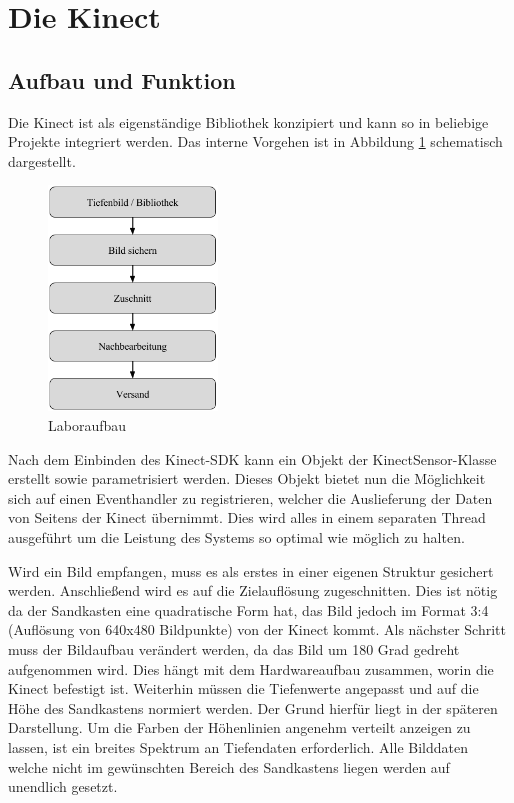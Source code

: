 \section{Die Kinect}
\begin{Spacing}{\mylinespace}

\subsection{Aufbau und Funktion}

Die Kinect ist als eigenständige Bibliothek konzipiert und kann so in beliebige Projekte integriert werden. Das interne Vorgehen ist in Abbildung \ref{fig:kinectdll} schematisch dargestellt. 

\begin{figure}[hbtp]
	\vspace{15px}
	\centering
	\includegraphics[width=0.4\textwidth]{graphics/block_dll.png}
	\caption{Laboraufbau}
	\label{fig:kinectdll}
\end{figure}

Nach dem Einbinden des Kinect-SDK kann ein Objekt der KinectSensor-Klasse erstellt sowie parametrisiert werden. Dieses Objekt bietet nun die Möglichkeit sich auf einen Eventhandler zu registrieren, welcher die Auslieferung der Daten von Seitens der Kinect übernimmt. Dies wird alles in einem separaten Thread ausgeführt um die Leistung des Systems so optimal wie möglich zu halten.

Wird ein Bild empfangen, muss es als erstes in einer eigenen Struktur gesichert werden. Anschließend wird es auf die Zielauflösung zugeschnitten.
Dies ist nötig da der Sandkasten eine quadratische Form hat, das Bild jedoch im Format 3:4 (Auflösung von 640x480 Bildpunkte) von der Kinect kommt.
Als nächster Schritt muss der Bildaufbau verändert werden, da das Bild um 180 Grad gedreht aufgenommen wird. Dies hängt mit dem Hardwareaufbau zusammen, worin die Kinect befestigt ist. Weiterhin müssen die Tiefenwerte angepasst und auf die Höhe des Sandkastens normiert werden. Der Grund hierfür liegt in der späteren Darstellung. Um die Farben der Höhenlinien angenehm verteilt anzeigen zu lassen, ist ein breites Spektrum an Tiefendaten erforderlich. Alle Bilddaten welche nicht im gewünschten Bereich des Sandkastens liegen werden auf unendlich gesetzt.


\end{Spacing}
